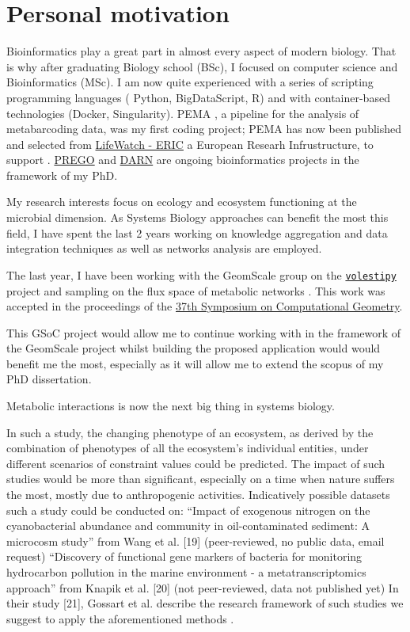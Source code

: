 \documentclass{article}
\begin{document}
\section{Personal motivation}

Bioinformatics play a great part in almost every aspect of modern biology.
That is why after graduating Biology school (BSc), I focused on computer science and Bioinformatics (MSc). 
I am now quite experienced with a series of scripting programming languages ( Python, BigDataScript, R) and with container-based technologies (Docker, Singularity).  
PEMA \cite{zafeiropoulos2020pema}, a pipeline for the analysis of metabarcoding data, was my first coding project; PEMA has now been published and selected from \href{https://www.lifewatch.eu/}{LifeWatch - ERIC} a European Researh Infrustructure, to support .
\href{http://prego.hcmr.gr/}{PREGO} and \href{https://github.com/hariszaf/darn/}{DARN} are ongoing bioinformatics projects in the framework of my PhD.

My research interests focus on ecology and ecosystem functioning at the microbial dimension.
As Systems Biology approaches can benefit the most this field, 
I have spent the last 2 years working on 
knowledge aggregation and data integration techniques as well as networks analysis are employed. 

The last year, I have been working with the GeomScale group on the \href{https://github.com/GeomScale/volume_approximation}{\texttt{volestipy}} project
and sampling on the flux space of metabolic networks \cite{chalkis2020geometric}. This work was accepted in the proceedings of the \href{https://cse.buffalo.edu/socg21/accepted.html}{37th Symposium on Computational Geometry}.

This GSoC project would allow me to continue working with in the framework of the GeomScale project whilst building the proposed application would would benefit me the most, especially as it will allow me to extend the scopus of my PhD dissertation.

Metabolic interactions \cite{cai2020predicting} is now the next big thing in systems biology. 


In such a study, the changing phenotype of an ecosystem, as derived by the combination of phenotypes of all the ecosystem's individual entities, under different scenarios of constraint values could be predicted. 
The impact of such studies would be more than significant, especially on a time when nature suffers the most, mostly due to anthropogenic activities. 
Indicatively possible datasets such a study could be conducted on: 
“Impact of exogenous nitrogen on the cyanobacterial abundance and community in oil-contaminated sediment: A microcosm study” from Wang et al. [19] 
(peer-reviewed, no public data, email request)
“Discovery of functional gene markers of bacteria for monitoring hydrocarbon pollution in the marine environment - a metatranscriptomics approach” from Knapik et al. [20]
(not peer-reviewed, data not published yet)
In their study [21], Gossart et al.  describe the research framework of such studies we suggest to apply the aforementioned methods .
\end{document}
